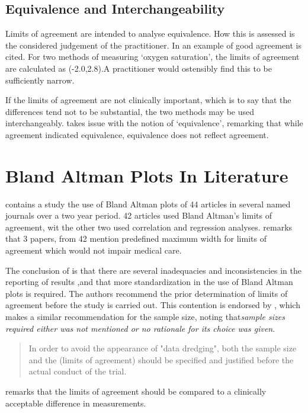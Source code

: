 \documentclass[12pt, a4paper]{report}
\begin{document}
\subsection{Equivalence and Interchangeability}
Limits of agreement are intended to analyse equivalence. How this
is assessed is the considered judgement of the practitioner. In
\citet{BA86} an example of good agreement is cited. For two
methods of measuring `oxygen saturation', the limits of agreement
are calculated as (-2.0,2.8).A practitioner would ostensibly find
this to be sufficiently narrow.

If the limits of agreement are not clinically important, which is
to say that the differences tend not to be substantial, the two
methods may be used interchangeably. \citet{DunnSEME} takes issue
with the notion of `equivalence', remarking that while agreement
indicated equivalence, equivalence does not reflect agreement.




\section{Bland Altman Plots In Literature}
\citet{mantha} contains a study the use of Bland Altman plots of
44 articles in several named journals over a two year period. 42
articles used Bland Altman's limits of agreement, wit the other
two used correlation and regression analyses. \citet{mantha}
remarks that 3 papers, from 42 mention predefined maximum width
for limits of agreement which would not impair medical care.

The conclusion of \citet{mantha} is that there are several
inadequacies and inconsistencies in the reporting of results ,and
that more standardization in the use of Bland Altman plots is
required. The authors recommend the prior determination of limits
of agreement before the study is carried out. This contention is
endorsed by \citet{lin}, which makes a similar recommendation for
the sample size, noting that\emph{sample sizes required either was
not mentioned or no rationale for its choice was given}.

\begin{quote}
In order to avoid the appearance of "data dredging", both the
sample size and the (limits of agreement) should be specified and
justified before the actual conduct of the trial. \citep{lin}
\end{quote}

\citet{Dewitte} remarks that the limits of agreement should be
compared to a clinically acceptable difference in measurements.
\end{document}
